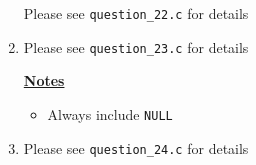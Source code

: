 \documentclass[12pt]{article}
\begin{document}
\begin{enumerate}[1.]
    Please see \texttt{question\_22.c} for details

    \item

    Please see \texttt{question\_23.c} for details

    \bigskip

    \underline{\textbf{Notes}}

    \begin{itemize}
        \item Always include \texttt{NULL}
    \end{itemize}

    \item

    Please see \texttt{question\_24.c} for details


\end{enumerate}
\end{document}
